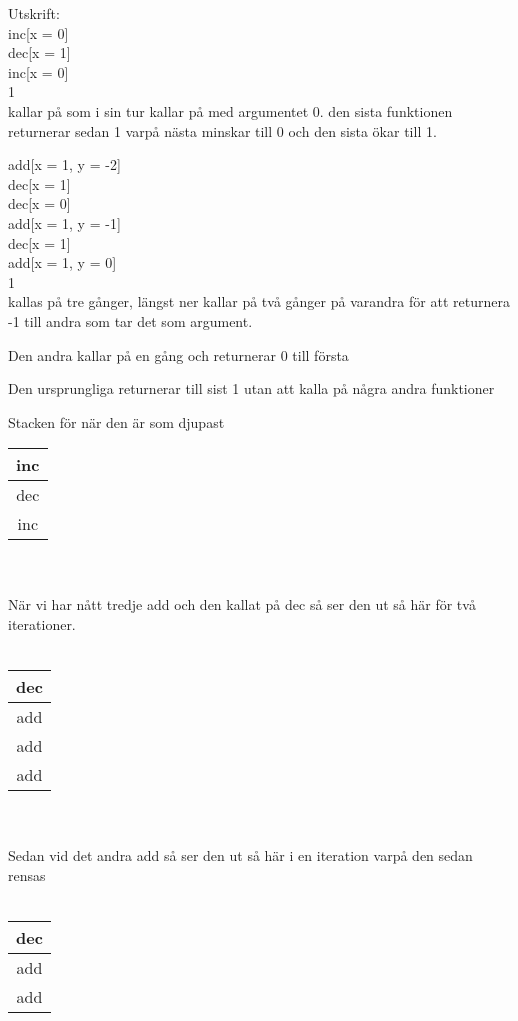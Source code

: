 \SOLUTION


\TaskSolved \what


\SubtaskSolved
Utskrift: \\
inc[x = 0]\\
dec[x = 1]\\
inc[x = 0]\\
1\\

 kallar på  som i sin tur kallar på  med argumentet 0. den sista funktionen returnerar sedan 1 varpå nästa minskar till 0 och den sista ökar till 1.

add[x = 1, y = -2]\\
dec[x = 1]\\
dec[x = 0]\\
add[x = 1, y = -1]\\
dec[x = 1]\\
add[x = 1, y = 0]\\
1\\

 kallas på tre gånger,  längst ner kallar på  två gånger på varandra för att returnera -1 till andra  som tar det som argument.

Den andra  kallar på  en gång och returnerar 0 till första 

Den ursprungliga  returnerar till sist 1 utan att kalla på några andra funktioner

\SubtaskSolved
Stacken för  när den är som djupast

\begin{tabular}{|c|}
\hline
inc \\
\hline
dec\\
\hline
inc \\
\hline
\end{tabular}
\\
\\
När vi har nått tredje add och den kallat på dec så ser den ut så här för två iterationer.
\\
\\
\begin{tabular}{|c|}

\hline
dec \\
\hline
add \\
\hline
add\\
\hline
add \\
\hline
\end{tabular}
\\
\\
Sedan vid det andra add så ser den ut så här i en iteration varpå den sedan rensas
\\
\\
\begin{tabular}{|c|}

\hline
dec \\
\hline
add \\
\hline
add\\
\hline
\end{tabular}



